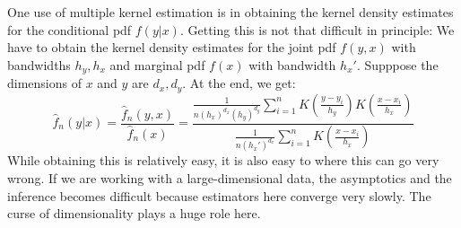 \documentclass[12pt]{article}
\theoremstyle{definition}
\theoremstyle{property}
\theoremstyle{assumption}
\theoremstyle{example}
\theoremstyle{comment}
\begin{document}
 One use of multiple kernel estimation is in obtaining the kernel density estimates for the conditional pdf $f(y|x)$. Getting this is not that difficult in principle: We have to obtain the kernel density estimates for the joint pdf $f(y,x)$ with bandwidths $h_y, h_x$ and marginal pdf $f(x)$ with bandwidth $h_x'$. Supppose the dimensions of $x$ and $y$  are $d_x, d_y$. At the end, we get:
 \[
 \hat{f}_n(y|x)= \frac{\hat{f}_n(y,x)}{\hat{f}_n(x)}=\frac{\frac{1}{n(h_x)^{d_x}(h_y)^{d_y}}\sum_{i=1}^n K\left(\frac{y-y_i}{h_y}\right)K\left(\frac{x-x_i}{h_x}\right)}{\frac{1}{n(h_x')^{d_x}}\sum_{i=1}^nK\left(\frac{x-x_i}{h_x}\right)}
 \]
 While obtaining this is relatively easy, it is also easy to where this can go very wrong. If we are working with a large-dimensional data, the asymptotics and the inference becomes difficult because estimators here converge very slowly. The curse of dimensionality plays a huge role here. 
 
\end{document}
